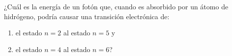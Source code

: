\item ¿Cuál es la energía de un fotón que, cuando es absorbido por un átomo de hidrógeno, podría causar una transición electrónica de:
\begin{enumerate}
    \item el estado $n = 2$ al estado $n = 5$ y
    \item el estado $n = 4$ al estado $n = 6$?
\end{enumerate}